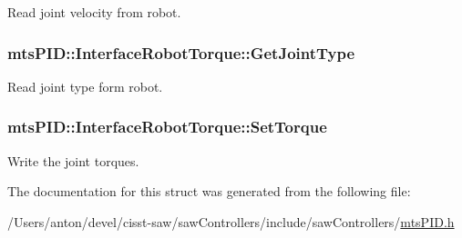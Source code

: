 Read joint velocity from robot. 

\hypertarget{structmts_p_i_d_1_1_interface_robot_torque_aa8d665775f11c3a1b25340727efe2d0c}{}
\subsubsection[{Get\+Joint\+Type}]{ mts\+P\+I\+D\+::\+Interface\+Robot\+Torque\+::\+Get\+Joint\+Type}\label{structmts_p_i_d_1_1_interface_robot_torque_aa8d665775f11c3a1b25340727efe2d0c}


Read joint type form robot. 

\hypertarget{structmts_p_i_d_1_1_interface_robot_torque_a05317acc6fa8b2e125d2a6c3f5d55f86}{}
\subsubsection[{Set\+Torque}]{ mts\+P\+I\+D\+::\+Interface\+Robot\+Torque\+::\+Set\+Torque}\label{structmts_p_i_d_1_1_interface_robot_torque_a05317acc6fa8b2e125d2a6c3f5d55f86}


Write the joint torques. 



The documentation for this struct was generated from the following file\+:\begin{DoxyCompactItemize}
\item 
/\+Users/anton/devel/cisst-\/saw/saw\+Controllers/include/saw\+Controllers/\hyperlink{mts_p_i_d_8h}{mts\+P\+I\+D.\+h}\end{DoxyCompactItemize}
